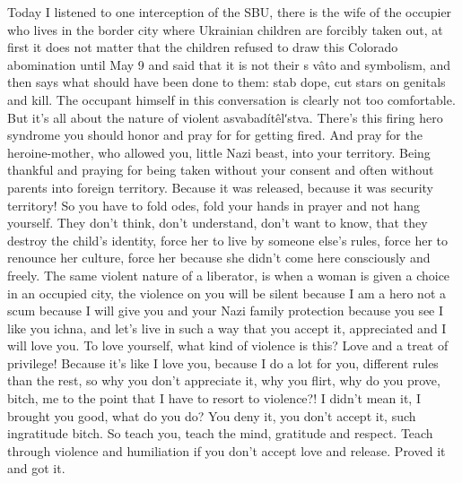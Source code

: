  
 
 
 
 

Today I listened to one interception of the SBU, there is the wife of the occupier who lives in the border city where Ukrainian children are forcibly taken out, at first it does not matter that the children refused to draw this Colorado abomination until May 9 and said that it is not their s vâto and symbolism, and then says what should have been done to them: stab dope, cut stars on genitals and kill. The occupant himself in this conversation is clearly not too comfortable.
But it's all about the nature of violent asvabadítêlʹstva.
There's this firing hero syndrome you should honor and pray for for getting fired.
And pray for the heroine-mother, who allowed you, little Nazi beast, into your territory.
Being thankful and praying for being taken without your consent and often without parents into foreign territory. Because it was released, because it was security territory! So you have to fold odes, fold your hands in prayer and not hang yourself.
They don't think, don't understand, don't want to know, that they destroy the child's identity, force her to live by someone else's rules, force her to renounce her culture, force her because she didn't come here consciously and freely.
The same violent nature of a liberator, is when a woman is given a choice in an occupied city, the violence on you will be silent because I am a hero not a scum because I will give you and your Nazi family protection because you see I like you ichna, and let's live in such a way that you accept it, appreciated and I will love you. To love yourself, what kind of violence is this? Love and a treat of privilege!
Because it's like I love you, because I do a lot for you, different rules than the rest, so why you don't appreciate it, why you flirt, why do you prove, bitch, me to the point that I have to resort to violence?!
I didn't mean it, I brought you good, what do you do? You deny it, you don't accept it, such ingratitude bitch. So teach you, teach the mind, gratitude and respect. Teach through violence and humiliation if you don't accept love and release. Proved it and got it.
